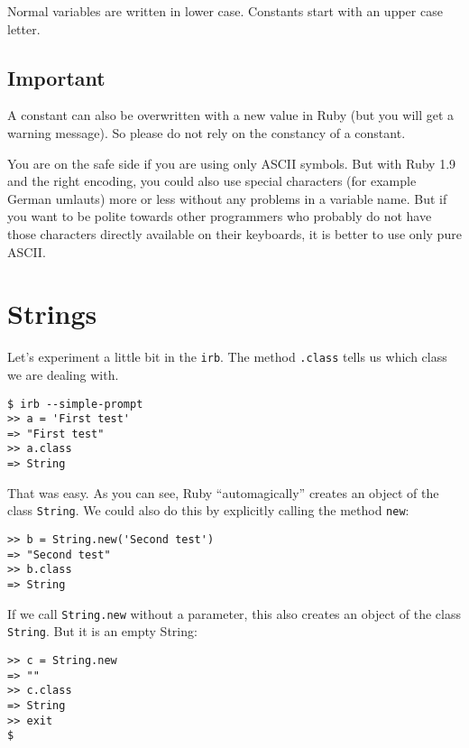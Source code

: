 \documentclass[a4paper]{book}
\begin{document}
Normal variables are written in lower case. Constants start with an upper case letter.

\subsection{Important}\label{important-1}

A constant can also be overwritten with a new value in Ruby (but you will get a warning message). So please do not rely on the constancy of a constant.

You are on the safe side if you are using only ASCII symbols. But with Ruby 1.9 and the right encoding, you could also use special characters (for example German umlauts) more or less without any problems in a variable name. But if you want to be polite towards other programmers who probably do not have those characters directly available on their keyboards, it is better to use only pure ASCII.

\section{Strings}\label{strings}

Let's experiment a little bit in the \texttt{irb}. The method \texttt{.class} tells us which class we are dealing with.

\begin{shaded}\begin{verbatim}
$ irb --simple-prompt
>> a = 'First test'
=> "First test"
>> a.class
=> String
\end{verbatim}\end{shaded}

That was easy. As you can see, Ruby “automagically” creates an object of the class \texttt{String}. We could also do this by explicitly calling the method \texttt{new}:

\begin{shaded}\begin{verbatim}
>> b = String.new('Second test')
=> "Second test"
>> b.class
=> String
\end{verbatim}\end{shaded}

If we call \texttt{String.new} without a parameter, this also creates an object of the class \texttt{String}. But it is an empty String:

\begin{shaded}\begin{verbatim}
>> c = String.new
=> ""
>> c.class
=> String
>> exit
$
\end{verbatim}\end{shaded}
\end{document}
